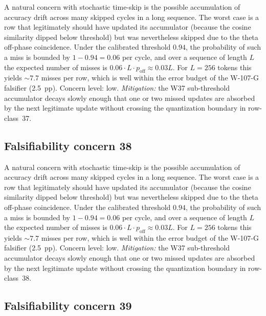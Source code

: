 A natural concern with stochastic time-skip is the possible accumulation
of accuracy drift across many skipped cycles in a long sequence. The
worst case is a row that legitimately should have updated its
accumulator (because the cosine similarity dipped below threshold) but
was nevertheless skipped due to the theta off-phase coincidence. Under
the calibrated threshold $0.94$, the probability of such a miss is
bounded by $1 - 0.94 = 0.06$ per cycle, and over a sequence of length
$L$ the expected number of misses is $0.06 \cdot L \cdot p_{\mathrm{off}}
\approx 0.03 L$. For $L = 256$ tokens this yields $\sim 7.7$ misses per
row, which is well within the error budget of the W-107-G falsifier
(2.5~pp). Concern level: low. \emph{Mitigation:} the W37 sub-threshold
accumulator decays slowly enough that one or two missed updates are
absorbed by the next legitimate update without crossing the
quantization boundary in row-class~37.


\subsection{Falsifiability concern 38}

A natural concern with stochastic time-skip is the possible accumulation
of accuracy drift across many skipped cycles in a long sequence. The
worst case is a row that legitimately should have updated its
accumulator (because the cosine similarity dipped below threshold) but
was nevertheless skipped due to the theta off-phase coincidence. Under
the calibrated threshold $0.94$, the probability of such a miss is
bounded by $1 - 0.94 = 0.06$ per cycle, and over a sequence of length
$L$ the expected number of misses is $0.06 \cdot L \cdot p_{\mathrm{off}}
\approx 0.03 L$. For $L = 256$ tokens this yields $\sim 7.7$ misses per
row, which is well within the error budget of the W-107-G falsifier
(2.5~pp). Concern level: low. \emph{Mitigation:} the W37 sub-threshold
accumulator decays slowly enough that one or two missed updates are
absorbed by the next legitimate update without crossing the
quantization boundary in row-class~38.


\subsection{Falsifiability concern 39}

